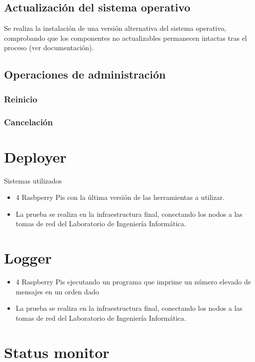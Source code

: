 \documentclass{article}
\begin{document}
\subsection*{Actualización del sistema operativo}

Se realiza la instalación de una versión alternativa del sistema operativo, comprobando que los componentes no actualizables permanecen intactas tras el proceso (ver documentación).

\subsection*{Operaciones de administración}

\subsubsection*{Reinicio}

\subsubsection*{Cancelación}

\section{Deployer}

Sistemas utilizados
\begin{itemize}
\item 4 Rasbperry Pis con la última versión de las herramientas a utilizar.
\item La prueba se realiza en la infraestructura final, conectando los nodos a las tomas de red del Laboratorio de Ingeniería Informática.
\end{itemize}

\section{Logger}

\begin{itemize}
\item 4 Raspberry Pis ejecutando un programa que imprime un número elevado de mensajes en un orden dado
\item La prueba se realiza en la infraestructura final, conectando los nodos a las tomas de red del Laboratorio de Ingeniería Informática.
\end{itemize}

\section{Status monitor}
\end{document}
